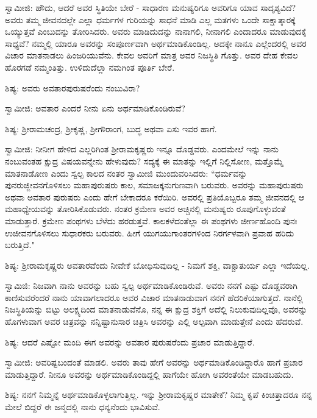 ಸ್ವಾಮೀಜಿ: ಹೌದು, ಆದರೆ ಅವರ ಸ್ಥಿತಿಯೇ ಬೇರೆ - ಸಾಧಾರಣ ಮನುಷ್ಯರಿಗೂ ಅವರಿಗೂ ಯಾವ ಸಾದೃಶ್ಯವಿದೆ? ಅವರು ತಮ್ಮ ಜೀವನದಲ್ಲೇ ಎಲ್ಲಾ ಧರ್ಮಗಳ ಗುರಿಯನ್ನು ಸಾಧನೆ ಮಾಡಿ ಎಲ್ಲ ಮತಗಳು ಒಂದೇ ಸಾಕ್ಷಾತ್ಕಾರಕ್ಕೆ ಒಯ್ಯುತ್ತವೆ ಎಂಬುದನ್ನು ತೋರಿಸಿದರು. ಅವರು ಮಾಡಿದುದನ್ನು ನಾನಾಗಲಿ, ನೀನಾಗಲಿ ಎಂದಾದರೂ ಮಾಡುವುದಕ್ಕೆ ಸಾಧ್ಯವೆ? ನಮ್ಮಲ್ಲಿ ಯಾರೂ ಅವರನ್ನು ಸಂಪೂರ್ಣವಾಗಿ ಅರ್ಥಮಾಡಿಕೊಂಡಿಲ್ಲ. ಅದಕ್ಕೇ ನಾನೂ ಎಲ್ಲೆಂದರಲ್ಲಿ ಅವರ ವಿಚಾರ ಮಾತನಾಡಲು ಹಿಂಜರಿಯುವೆನು. ಕೇವಲ ಅವರಿಗೆ ಮಾತ್ರ ಅವರ ನಿಜಸ್ಥಿತಿ ಗೊತ್ತು. ಅವರ ದೇಹ ಕೇವಲ ಹೊರಗಡೆ ನಮ್ಮಂತಿತ್ತು. ಉಳಿದುದೆಲ್ಲಾ ನಮಗಿಂತ ಪೂರ್ತಿ ಬೇರೆ.

ಶಿಷ್ಯ: ಅವರು ಅವತಾರಪುರುಷರೆಂದು ನಂಬುವಿರಾ?

ಸ್ವಾಮೀಜಿ: ಅವತಾರ ಎಂದರೆ ನೀನು ಏನು ಅರ್ಥಮಾಡಿಕೊಂಡಿರುವೆ?

ಶಿಷ್ಯ: ಶ‍್ರೀರಾಮಚಂದ್ರ, ಶ‍್ರೀಕೃಷ್ಣ, ಶ‍್ರೀಗೌರಾಂಗ, ಬುದ್ಧ ಅಥವಾ ಏಸು ಇವರ ಹಾಗೆ.

ಸ್ವಾಮೀಜಿ: ನೀನೀಗ ಹೇಳಿದ ಎಲ್ಲರಿಗಿಂತ ಶ‍್ರೀರಾಮಕೃಷ್ಣರು ಇನ್ನೂ ದೊಡ್ಡವರು. ಎಂದಮೇಲೆ ಇನ್ನು ನಾನು ನಂಬುವಂತಹ ಕ್ಷುದ್ರ ವಿಷಯವನ್ನೇನು ಹೇಳುವುದು? ಸದ್ಯಕ್ಕೆ ಈ ಮಾತನ್ನು ಇಲ್ಲಿಗೆ ನಿಲ್ಲಿಸೋಣ, ಮತ್ತೊಮ್ಮೆ ಮಾತನಾಡೋಣ ಎಂದು ಸ್ವಲ್ಪ ಕಾಲದ ನಂತರ ಸ್ವಾಮೀಜಿ ಮುಂದುವರಿಸಿದರು: “ಧರ್ಮವನ್ನು ಪುನರುಜ್ಜೀವನಗೊಳಿಸಲು ಮಹಾಪುರುಷರು ಕಾಲ, ಸಮಾಜಕ್ಕನುಗುಣವಾಗಿ ಬರುವರು. ಅವರನ್ನು ಮಹಾಪುರುಷರು ಅಥವಾ ಅವತಾರ ಪುರುಷರು ಎಂದು ಹೇಗೆ ಬೇಕಾದರೂ ಕರೆಯಿರಿ. ಅವರಲ್ಲಿ ಪ್ರತಿಯೊಬ್ಬರೂ ತಮ್ಮ ಜೀವನದಲ್ಲಿ ಆ ಮಹಾಧ್ಯೇಯವನ್ನು ತೋರಿಸಿಕೊಡುವರು. ನಂತರ ಕ್ರಮೇಣ ಅವರ ಅಚ್ಚಿನಲ್ಲಿ ಮನುಷ್ಯರು ರೂಪುಗೊಳ್ಳುವಂತೆ ಮಾಡುತ್ತಾರೆ. ಕ್ರಮೇಣ ಪಂಥಗಳು ಬೆಳೆದು ಹರಡುತ್ತವೆ. ಕಾಲಕಳೆದಂತೆಲ್ಲಾ ಈ ಪಂಥಗಳು ಜೀರ್ಣಹೊಂದಿ ಪುನಃ ಉಜೀವನಗೊಳಿಸಲು ಸುಧಾರಕರು ಬರುವರು. ಹೀಗೆ ಯುಗಯುಗಾಂತರಗಳಿಂದ ನಿರರ್ಗಳವಾಗಿ ಪ್ರವಾಹ ಹರಿದು ಬರುತ್ತಿದೆ."

ಶಿಷ್ಯ: ಶ‍್ರೀರಾಮಕೃಷ್ಣರು ಅವತಾರವೆಂದು ನೀವೇಕೆ ಬೋಧಿಸುವುದಿಲ್ಲ - ನಿಮಗೆ ಶಕ್ತಿ, ವಾಕ್ಚಾತುರ್ಯ ಎಲ್ಲಾ ಇದೆಯಲ್ಲ.

ಸ್ವಾಮಿಜಿ: ನಿಜವಾಗಿ ನಾನು ಅವರನ್ನು ಬಹು ಸ್ವಲ್ಪ ಅರ್ಥಮಾಡಿಕೊಂಡಿರುವೆ. ಅವರು ನನಗೆ ಎಷ್ಟು ದೊಡ್ಡವರಾಗಿ ಕಾಣಿಸುವರೆಂದರೆ ನಾನು ಯಾವಾಗಲಾದರೂ ಅವರ ವಿಚಾರ ಮಾತನಾಡುವಾಗ ನನಗೆ ಹೆದರಿಕೆಯಾಗುತ್ತದೆ. ನಾನೆಲ್ಲಿ ನಿಜಸ್ಥಿತಿಯನ್ನು ಬಿಟ್ಟು ಅಲಕ್ಷ್ಯದಿಂದ ಮಾತನಾಡುವೆನೊ, ನನ್ನ ಈ ಕ್ಷುದ್ರ ಶಕ್ತಿಗೆ ಅದೆಲ್ಲಿ ನಿಲುಕುವುದಿಲ್ಲವೊ, ಅವರನ್ನು ಹೊಗಳುವಾಗ ಅವರ ಚಿತ್ರವನ್ನು ನನ್ನಿಷ್ಟಾನುಸಾರ ಚಿತ್ರಿಸಿ ಅವರನ್ನು ಎಲ್ಲಿ ಅಲ್ಪವಾಗಿ ಮಾಡುತ್ತೇನೆ ಎಂದು ಹೆದರುವೆ.

ಶಿಷ್ಯ: ಆದರೆ ಎಷ್ಟೋ ಮಂದಿ ಈಗ ಅವರನ್ನು ಅವತಾರ ಪುರುಷರೆಂದು ಪ್ರಚಾರ ಮಾಡುತ್ತಿದ್ದಾರೆ.

ಸ್ವಾಮೀಜಿ: ಅವರಿಷ್ಟಬಂದಂತೆ ಮಾಡಲಿ. ಅವರು ತಾವು ಹೇಗೆ ಅವರನ್ನು ಅರ್ಥಮಾಡಿಕೊಂಡಿದ್ದಾರೊ ಹಾಗೆ ಪ್ರಚಾರ ಮಾಡುತ್ತಿದ್ದಾರೆ. ನೀನೂ ಅವರನ್ನು ಅರ್ಥಮಾಡಿಕೊಂಡಿದ್ದಲ್ಲಿ ಹಾಗೆಯೇ ಹೋಗಿ ಅವರಂತೆಯೇ ಮಾಡಬಹುದು.

ಶಿಷ್ಯ: ನನಗೆ ನಿಮ್ಮನ್ನೆ ಅರ್ಥಮಾಡಿಕೊಳ್ಳಲಾಗುತ್ತಿಲ್ಲ. ಇನ್ನು ಶ‍್ರೀರಾಮಕೃಷ್ಣರ ಮಾತೇಕೆ? ನಿಮ್ಮ ಕೃಪೆ ಕಿಂಚಿತ್ತಾದರೂ ನನ್ನ ಮೇಲೆ ಬಿದ್ದರೆ ಈ ಜನ್ಮದಲ್ಲಿ ನಾನು ಧನ್ಯನೆಂದು ಭಾವಿಸುವೆ.

\newpage

